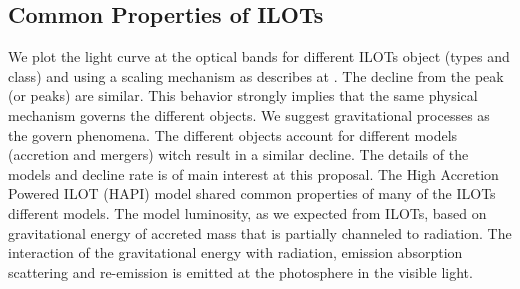 \documentclass[a4paper,12pt,modern]{aastex62}
\begin{document}
\subsection{Common Properties of ILOTs}
We plot the light curve at the optical bands for different ILOTs object (types and class) and using a scaling mechanism as describes at \cite{2010ApJ...709L..11K}. The decline from the peak (or peaks) are similar. This behavior strongly implies that the same physical mechanism governs the different objects. We suggest gravitational processes as the govern phenomena. The different objects account for different models (accretion and mergers) witch result in a similar decline. The details of the models and decline rate is of main interest at this proposal. The High Accretion Powered ILOT (HAPI) model shared common properties of many of the ILOTs different models. The model luminosity, as we expected from ILOTs, based on gravitational energy of accreted mass that is partially channeled to radiation. The interaction of the gravitational energy with radiation, emission absorption scattering and re-emission is emitted at the photosphere in the visible light. 
\end{document}

